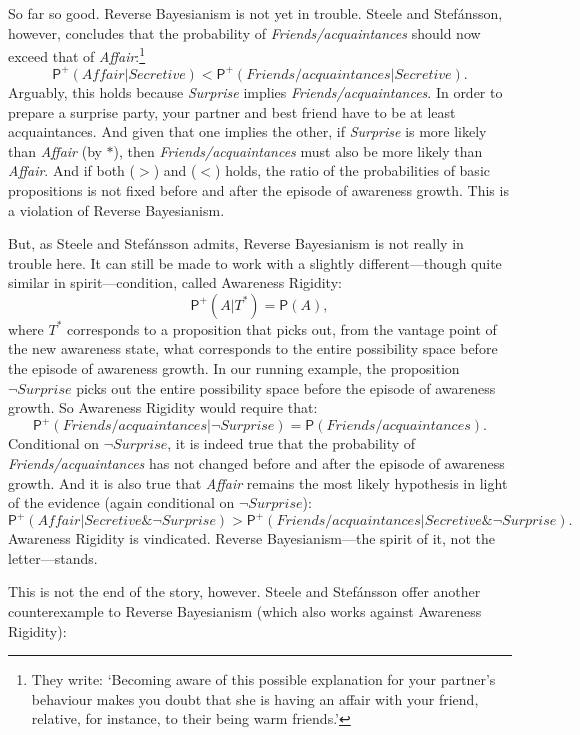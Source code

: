 \documentclass[
  11pt,
  dvipsnames,enabledeprecatedfontcommands]{scrartcl}
\newcommand{\pr}[1]{\ensuremath{\mathsf{P}(#1)}}
\newcommand{\ppr}[2]{\ensuremath{\mathsf{P}^{#1}(#2)}}
\begin{document}
So far so good. Reverse Bayesianism is not yet in trouble. Steele and
Stefánsson, however, concludes that the probability of
\textit{Friends/acquaintances} should now exceed that of
\textit{Affair}:\footnote{They write: `Becoming aware of this possible
  explanation for your partner's behaviour makes you doubt that she is
  having an affair with your friend, relative, for instance, to their
  being warm friends.'}
\[\ppr{+}{\textit{Affair} \vert  \textit{Secretive} } < \ppr{+}{\textit{Friends/acquaintances} \vert \textit{Secretive}}. \tag{<}\]
Arguably, this holds because \textit{Surprise} implies
\textit{Friends/acquaintances}. In order to prepare a surprise party,
your partner and best friend have to be at least acquaintances. And
given that one implies the other, if \textit{Surprise} is more likely
than \textit{Affair} (by \(*\)), then \textit{Friends/acquaintances}
must also be more likely than \textit{Affair}. And if both (\(>\)) and
(\(<\)) holds, the ratio of the probabilities of basic propositions is
not fixed before and after the episode of awareness growth. This is a
violation of Reverse Bayesianism.

But, as Steele and Stefánsson admits, Reverse Bayesianism is not really
in trouble here. It can still be made to work with a slightly
different---though quite similar in spirit---condition, called Awareness
Rigidity: \[\ppr{+}{A \vert T^*}=\pr{A},\] where \(T^*\) corresponds to
a proposition that picks out, from the vantage point of the new
awareness state, what corresponds to the entire possibility space before
the episode of awareness growth. In our running example, the proposition
\(\neg\textit{Surprise}\) picks out the entire possibility space before
the episode of awareness growth. So Awareness Rigidity would require
that:
\[\ppr{+}{\textit{Friends/acquaintances} \vert \neg\textit{Surprise}}=\pr{\textit{Friends/acquaintances}}.\]
Conditional on \(\neg\textit{Surprise}\), it is indeed true that the
probability of \textit{Friends/acquaintances} has not changed before and
after the episode of awareness growth. And it is also true that
\textit{Affair} remains the most likely hypothesis in light of the
evidence (again conditional on \(\neg\textit{Surprise}\)):
\[\ppr{+}{\textit{Affair} \vert  \textit{Secretive} \& \neg\textit{Surprise} } > \ppr{+}{\textit{Friends/acquaintances} \vert \textit{Secretive} \& \neg\textit{Surprise}}. \tag{$>^+$}\]
Awareness Rigidity is vindicated. Reverse Bayesianism---the spirit of
it, not the letter---stands.

This is not the end of the story, however. Steele and Stefánsson offer
another counterexample to Reverse Bayesianism (which also works against
Awareness Rigidity):
\end{document}
